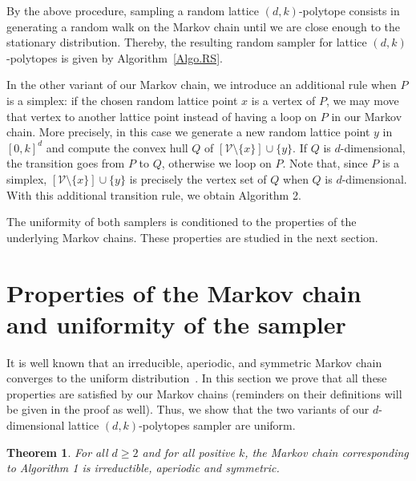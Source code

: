 \documentclass[a4paper]{article}
\newtheorem{theorem}{Theorem}
\begin{document}

\vspace{4ex}



\newpage

By the above procedure, sampling a random lattice $(d,k)$-polytope consists in generating a random walk on the Markov chain until we are close enough to the stationary distribution. Thereby, the resulting random sampler for lattice $(d,k)$-polytopes is given by Algorithm~\ref{Algo.RS}.

In the other variant of our Markov chain, we introduce an additional rule when $P$ is a simplex: if the chosen random lattice point $x$ is a vertex of $P$, we may move that vertex to another lattice point instead of having a loop on $P$ in our Markov chain. More precisely, in this case we generate a new random lattice point $y$ in $[0,k]^d$ and compute the convex hull $Q$ of $[\mathcal{V}\mathord{\setminus}\{x\}]\cup\{y\}$. If $Q$ is $d$-dimensional, the transition goes from $P$ to $Q$, otherwise we loop on $P$. Note that, since $P$ is a simplex, $[\mathcal{V}\mathord{\setminus}\{x\}]\cup\{y\}$ is precisely the vertex set of $Q$ when $Q$ is $d$-dimensional. With this additional transition rule, we obtain Algorithm 2.


The uniformity of both samplers is conditioned to the properties of the underlying Markov chains. These properties are studied in the next section.

\section{Properties of the Markov chain and uniformity of the sampler}\label{Sec.Pr}

It is well known that an irreducible, aperiodic, and symmetric Markov chain converges to the uniform distribution~\cite{levin2009markov}. In this section we prove that all these properties are satisfied by our Markov chains (reminders on their definitions will be given in the proof as well). Thus, we show that the two variants of our $d$-dimensional lattice $(d,k)$-polytopes sampler are uniform.

\begin{theorem}\label{Thm.MC}
  For all $d\geq2$ and for all positive $k$, the Markov chain corresponding to Algorithm 1 is irreductible, aperiodic and symmetric.
\end{theorem}
\end{document}
